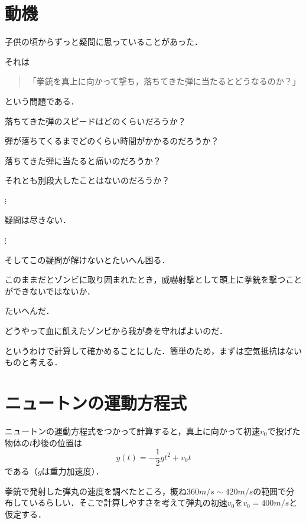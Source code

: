 \documentclass[a4paper,12pt]{jarticle}
\theoremstyle{definition}%
\begin{document}
\section{動機}
	


子供の頃からずっと疑問に思っていることがあった．


それは

\begin{quote}「拳銃を真上に向かって撃ち，落ちてきた弾に当たるとどうなるのか？」
\end{quote}

という問題である．

\bigskip

落ちてきた弾のスピードはどのくらいだろうか？

弾が落ちてくるまでどのくらい時間がかかるのだろうか？

落ちてきた弾に当たると痛いのだろうか？

それとも別段大したことはないのだろうか？

$\vdots$

疑問は尽きない．

$\vdots$


そしてこの疑問が解けないとたいへん困る．

このままだとゾンビに取り囲まれたとき，威嚇射撃として頭上に拳銃を撃つことができないではないか．

たいへんだ．

どうやって血に飢えたゾンビから我が身を守ればよいのだ．


というわけで計算して確かめることにした．簡単のため，まずは空気抵抗はないものと考える．



\section{ニュートンの運動方程式}

ニュートンの運動方程式をつかって計算すると，真上に向かって初速$v_0$で投げた物体の$t$秒後の位置は
\[ 
y(t)=-\frac{1}{2}gt^2+v_0 t
\]
である（$g$は重力加速度）．


拳銃で発射した弾丸の速度を調べたところ，概ね$360m/s \sim 420m/s$の範囲で分布しているらしい．そこで計算しやすさを考えて弾丸の初速$v_0$を$v_0=400m/s$と仮定する．
\end{document}
